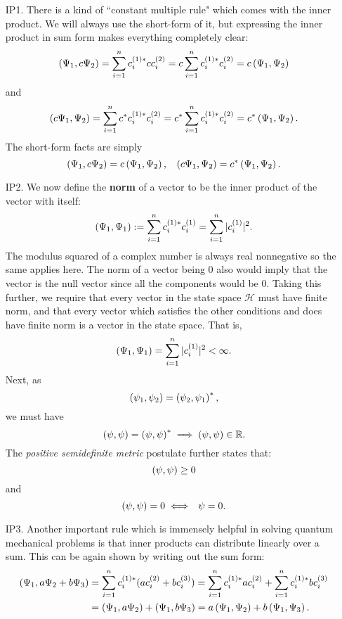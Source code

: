 \begin{enumerate}
    \item[IP1.] There is a kind of ``constant multiple rule" which comes with the inner product. We will always use the short-form of it, but expressing the inner product in sum form makes everything completely clear:
    $$
    \oip{\Psi_{1}}{c\Psi_{2}}=\sum_{i=1}^{n}c^{(1)\ast}_{i}cc^{(2)}_{i} = c\sum_{i=1}^{n}c^{(1)\ast}_{i}c^{(2)}_{i}=c\oip{\Psi_{1}}{\Psi_{2}}
    $$
    and
    $$
    \oip{c\Psi_{1}}{\Psi_{2}}=\sum_{i=1}^{n}c^{\ast}c^{(1)\ast}_{i}c^{(2)}_{i} = c^{\ast}\sum_{i=1}^{n}c^{(1)\ast}_{i}c^{(2)}_{i}=c^{\ast}\oip{\Psi_{1}}{\Psi_{2}}.
    $$
    The short-form facts are simply
    $$
    \oip{\Psi_{1}}{c\Psi_{2}}=c\oip{\Psi_{1}}{\Psi_{2}},\:\:\:\: \oip{c\Psi_{1}}{\Psi_{2}}=c^{\ast}\oip{\Psi_{1}}{\Psi_{2}}.
    $$
    \item[IP2.]
    We now define the \textbf{norm} of a vector to be the inner product of the vector with itself:
    $$
    \oip{\Psi_{1}}{\Psi_{1}}:=\sum_{i=1}^{n}c^{(1)\ast}_{i}c^{(1)}_{i}=\sum_{i=1}^{n}|c^{(1)}_{i}|^2.
    $$
    The modulus squared of a complex number is always real nonnegative so the same applies here. The norm of a vector being $0$ also would imply that the vector is the null vector since all the components would be 0. Taking this further, we require that every vector in the state space $\mathscr{H}$ must have finite norm, and that every vector which satisfies the other conditions and does have finite norm is a vector in the state space.
    That is,
    $$
    \oip{\Psi_{1}}{\Psi_{1}}=\sum_{i=1}^{n}|c^{(1)}_{i}|^2<\infty.
    $$
    Next, as 
    $$
    \oip{\psi_{1}}{\psi_{2}}=\oip{\psi_{2}}{\psi_{1}}^{\ast},
    $$
    we must have 
    $$
    \oip{\psi}{\psi}=\oip{\psi}{\psi}^{\ast}\implies \oip{\psi}{\psi}\in\R.
    $$
    The \textit{positive semidefinite metric} postulate further states that:
    $$
    \oip{\psi}{\psi} \geq 0
    $$ and
    $$
    \oip{\psi}{\psi} = 0 \iff\:\: \psi = 0.
    $$
    \item[IP3.]\label{LDip} Another important rule which is immensely helpful in solving quantum mechanical problems is that inner products can distribute linearly over a sum. This can be again shown by writing out the sum form:
    $$
    \begin{aligned}
    \oip{\Psi_{1}}{a\Psi_{2}+b\Psi_{3}}&=\sum_{i=1}^{n}c^{(1)\ast}_{i}(ac^{(2)}_{i}+bc^{(3)}_{i})=\sum_{i=1}^{n}c^{(1)\ast}_{i}ac^{(2)}_{i}+\sum_{i=1}^{n}c^{(1)\ast}_{i}bc^{(3)}_{i}\\
    &=\oip{\Psi_{1}}{a\Psi_{2}}+\oip{\Psi_{1}}{b\Psi_{3}}=a\oip{\Psi_{1}}{\Psi_{2}}+b\oip{\Psi_{1}}{\Psi_{3}}.

\end{aligned}$$
\end{enumerate}
